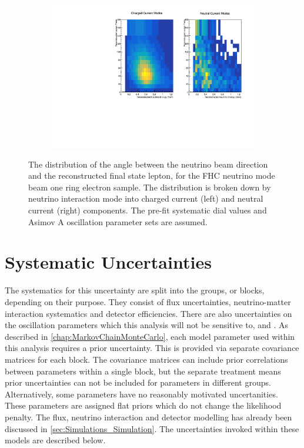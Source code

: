 \begin{figure}[h]
  \begin{subfigure}[t]{\textwidth}
    \includegraphics[width=\textwidth, trim={0mm 0mm 0mm 0mm}, clip,page=1]{Figures/Selections/2DSpectra_FHC1Re-2020.pdf}
  \end{subfigure}
  \caption{The distribution of the angle between the neutrino beam direction and the reconstructed final state lepton, for the FHC neutrino mode beam one ring electron sample. The distribution is broken down by neutrino interaction mode into charged current (left) and neutral current (right) components. The pre-fit systematic dial values and Asimov A oscillation parameter sets are assumed.}
  \label{fig:SelsAndSysts_Beam_FHC1ReThetaSpectra}
\end{figure}

\clearpage
\section{Systematic Uncertainties}
\label{sec:SelsAndSysts_Systs}

The systematics for this uncertainty are split into the groups, or blocks, depending on their purpose. They consist of flux uncertainties, neutrino-matter interaction systematics and detector efficiencies. There are also uncertainties on the oscillation parameters which this analysis will not be sensitive to, \delmsqsol and \sinsqsol. As described in \autoref{chap:MarkovChainMonteCarlo}, each model parameter used within this analysis requires a prior uncertainty. This is provided via separate covariance matrices for each block. The covariance matrices can include prior correlations between parameters within a single block, but the separate treatment means prior uncertainties can not be included for parameters in different groups. Alternatively, some parameters have no reasonably motivated uncertanities. These parameters are assigned flat priors which do not change the likelihood penalty. The flux, neutrino interaction and detector modelling has already been discussed in \autoref{sec:Simulations_Simulation}. The uncertainties invoked within these models are described below.

